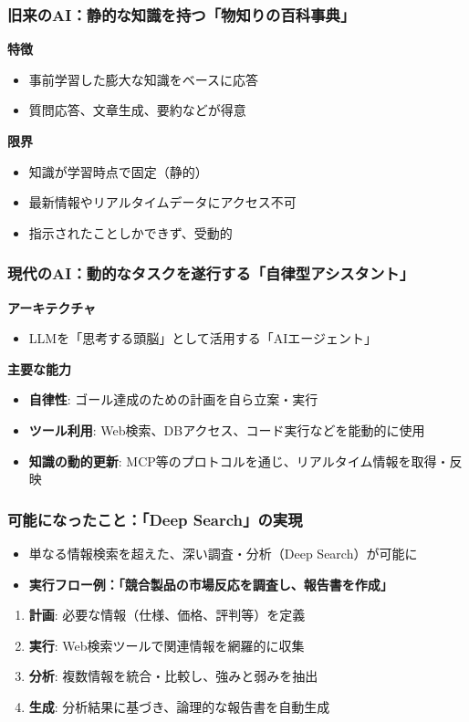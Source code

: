 \documentclass[uplatex,dvipdfmx,9pt,a4paper]{beamer}
\begin{document}
\begin{frame}%
  \frametitle{旧来のAI：静的な知識を持つ「物知りの百科事典」}
  \textbf{特徴}
  \begin{itemize}
    \item 事前学習した膨大な知識をベースに応答
    \item 質問応答、文章生成、要約などが得意
  \end{itemize}
  \vspace{1em}
  \textbf{限界}
  \begin{itemize}
    \item 知識が学習時点で固定（静的）
    \item 最新情報やリアルタイムデータにアクセス不可
    \item 指示されたことしかできず、受動的
  \end{itemize}
\end{frame}

\begin{frame}%
  \frametitle{現代のAI：動的なタスクを遂行する「自律型アシスタント」}
  \textbf{アーキテクチャ}
  \begin{itemize}
    \item LLMを「思考する頭脳」として活用する「AIエージェント」
  \end{itemize}
  \vspace{1em}
  \textbf{主要な能力}
  \begin{itemize}
    \item \textbf{自律性}: ゴール達成のための計画を自ら立案・実行
    \item \textbf{ツール利用}: Web検索、DBアクセス、コード実行などを能動的に使用
    \item \textbf{知識の動的更新}: MCP等のプロトコルを通じ、リアルタイム情報を取得・反映
  \end{itemize}
\end{frame}

\begin{frame}[fragile] %
  \frametitle{可能になったこと：「Deep Search」の実現}
    \begin{itemize}
        \item 単なる情報検索を超えた、深い調査・分析（Deep Search）が可能に
        \item \textbf{実行フロー例：「競合製品の市場反応を調査し、報告書を作成」}
    \end{itemize}
    \begin{enumerate}
        \item<1-> \textbf{計画}: 必要な情報（仕様、価格、評判等）を定義
        \item<2-> \textbf{実行}: Web検索ツールで関連情報を網羅的に収集
        \item<3-> \textbf{分析}: 複数情報を統合・比較し、強みと弱みを抽出
        \item<4-> \textbf{生成}: 分析結果に基づき、論理的な報告書を自動生成
    \end{enumerate}
\end{frame}
\end{document}
